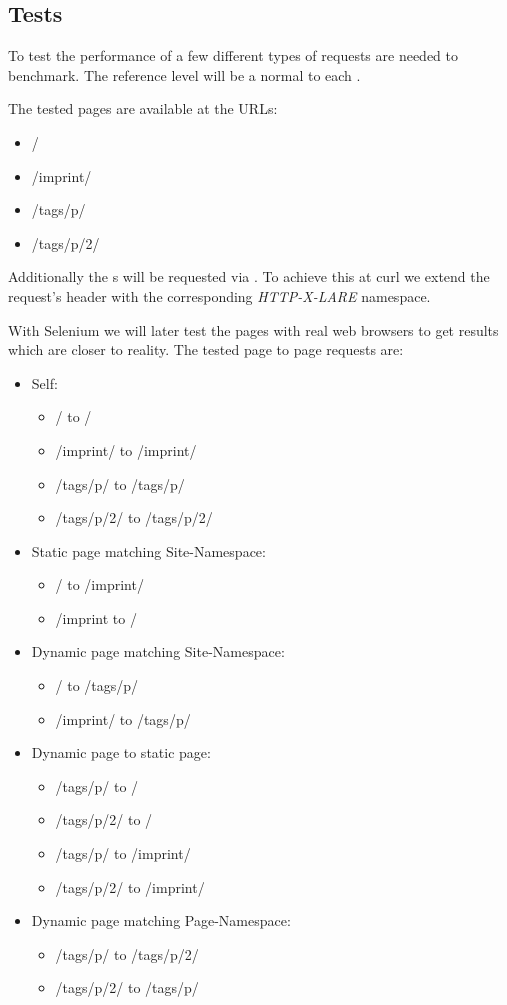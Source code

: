 \subsection{Tests}

To test the performance of \lare{} a few different types of requests are needed to benchmark.
The reference level will be a normal \httpRequest{} to each \webPage{}.

The tested pages are available at the URLs:

\begin{itemize}
\item /
\item /imprint/
\item /tags/p/
\item /tags/p/2/
\end{itemize}

Additionally the \webPage{}s will be requested via \lare{}.
To achieve this at curl we extend the request's header with the corresponding \emph{HTTP-X-LARE} namespace.

With Selenium we will later test the pages with real web browsers to get results which are closer to reality.
The tested page to page requests are:

\begin{itemize}
  \item Self:
    \begin{itemize}
      \item / to /
      \item /imprint/ to /imprint/
      \item /tags/p/ to /tags/p/
      \item /tags/p/2/ to /tags/p/2/
    \end{itemize}
  \item Static page matching Site-Namespace:
    \begin{itemize}
      \item / to /imprint/
      \item /imprint to /
    \end{itemize}
  \item Dynamic page matching Site-Namespace:
    \begin{itemize}
      \item / to /tags/p/
      \item /imprint/ to /tags/p/
    \end{itemize}
  \item Dynamic page to static page:
    \begin{itemize}
      \item /tags/p/ to /
      \item /tags/p/2/ to /
      \item /tags/p/ to /imprint/
      \item /tags/p/2/ to /imprint/
    \end{itemize}
  \item Dynamic page matching Page-Namespace:
    \begin{itemize}
      \item /tags/p/ to /tags/p/2/
      \item /tags/p/2/ to /tags/p/
    \end{itemize}
\end{itemize}

